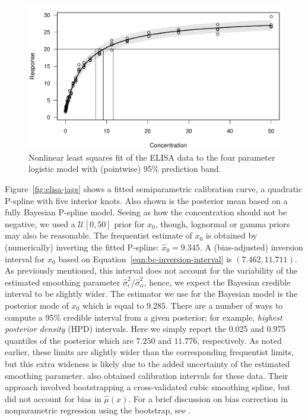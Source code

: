 \documentclass[cmfont,usenames,dvipsnames,leqno]{afit-etd}\usepackage[]{graphicx}\usepackage[]{color}
\makeatletter
\def\maxwidth{ %
  \ifdim\Gin@nat@width>\linewidth
    \linewidth
  \else
    \Gin@nat@width
  \fi
}
\newenvironment{knitrout}{}{} %
\renewenvironment{knitrout}{\begin{singlespace}}{\end{singlespace}}
\newcommand{\mc}[1]{\ensuremath{\mathcal{#1}}}
\newcommand{\wh}[1]{\ensuremath{\widehat{#1}}}
\makeatother
\begin{document}
\begin{knitrout}
\color{fgcolor}\begin{figure}[H]

\includegraphics[width=\maxwidth]{figure/elisa-nls} \caption[Four parameter logistic model for the ELISA data]{Nonlinear least squares fit of the ELISA data to the four parameter logistic model with (pointwise) 95\% prediction band.\label{fig:elisa-nls}}
\end{figure}


\end{knitrout}


Figure~\ref{fig:elisa-jags} shows a fitted semiparametric calibration curve, a quadratic \ac{P-spline} with five interior knots. Also shown is the posterior mean based on a fully Bayesian \ac{P-spline} model. Seeing as how the concentration should not be negative, we used a $\mc{U}[0, 50]$ prior for $x_0$, though, lognormal or gamma priors may also be reasonable. The frequentist estimate of $x_0$ is obtained by (numerically) inverting the fitted \ac{P-spline}: $\wh{x}_0 = 9.345$. A (bias-adjusted) inversion interval for $x_0$ based on Equation~\eqref{eqn:bc-inversion-interval} is $(7.462, 11.711)$. As previously mentioned, this interval does not account for the variability of the estimated smoothing parameter $\wh{\sigma}_\epsilon^2/\wh{\sigma}_\alpha^2$, hence, we expect the Bayesian credible interval to be slightly wider. The estimator we use for the Bayesian model is the posterior mode of $x_0$ which is equal to $9.285$. There are a number of ways to compute a 95\% credible interval from a given posterior; for example, \textit{highest posterior density} (HPD) intervals. Here we simply report the 0.025 and 0.975 quantiles of the posterior which are $7.250$ and $11.776$, respectively. As noted earlier, these limits are slightly wider than the corresponding frequentist limits, but this extra wideness is likely due to the added uncertainty of the estimated smoothing parameter. \citet{ori_constructing_1995} also obtained calibration intervals for these data. Their approach involved bootstrapping a cross-validated cubic smoothing spline, but did not account for bias in $\wh{\mu}(x)$. For a brief discussion on bias correction in nonparametric regression using the bootstrap, see \citet[pp. 362-366]{davison_bootstrap_1997}.
\end{document}
